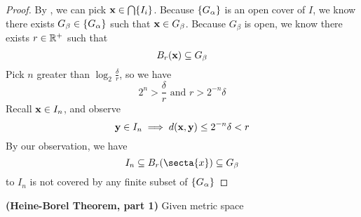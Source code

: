 \documentclass{report}
\begin{document}
\begin{proof}
By , we can pick $\textbf{x}\in \bigcap \{ I_i \}$. Because $\{ G_\alpha  \}$ is an open cover of $I$, we know there exists $G_\beta \in \{ G_\alpha  \}$ such that $\textbf{x}\in G_\beta $. Because $G_\beta $ is open, we know there exists $r\in\mathbb{R}^+$ such that
\begin{equation}
B_r(\textbf{x})\subseteq G_\beta 
\end{equation}
Pick $n$ greater than $\log_2 \frac{\delta}{r}$, so we have
 \begin{equation}
2^n>\frac{\delta}{r}\text{ and }r>2^{-n}\delta
\end{equation}
Recall $\textbf{x}\in I_n$, and observe
\begin{equation}
\textbf{y}\in I_n\implies d(\textbf{x},\textbf{y})\leq 2^{-n}\delta<r
\end{equation}
By our observation, we have
\begin{equation}
I_n \subseteq B_r(\secta{x})\subseteq G_{\beta }
\end{equation}
\CaC to $I_n$ is not covered by any finite subset of $\{ G_\alpha  \}$
\end{proof}
\begin{theorem}
\textbf{(Heine-Borel Theorem, part 1)} Given  metric space
\end{theorem}
\end{document}
